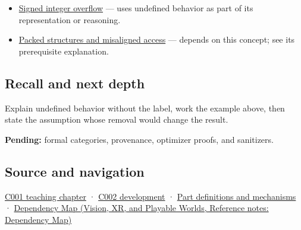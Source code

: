\hypertarget{appendix-f558f5b4d8f2-used-by}{}

\begin{itemize}
\item
  \hyperref[appendix-1a599c924a4e]{Signed integer overflow} --- uses undefined behavior as part of its representation or reasoning.
\item
  \hyperref[appendix-0682dbfc5f0e]{Packed structures and misaligned access} --- depends on this concept; see its prerequisite explanation.
\end{itemize}

\subsection{Recall and next depth}\label{appendix-f558f5b4d8f2-recall-and-next-depth}

\hypertarget{appendix-f558f5b4d8f2-recall-and-next-depth}{}

Explain undefined behavior without the label, work the example above, then state the assumption whose removal would change the result.

\textbf{Pending:} formal categories, provenance, optimizer proofs, and sanitizers.

\subsection{Source and navigation}\label{appendix-f558f5b4d8f2-source-and-navigation}

\hypertarget{appendix-f558f5b4d8f2-source-and-navigation}{}

\hyperref[01-foundations-i-ch001-from-a-signal-to-an-interpretation]{C001 teaching chapter} · \hyperref[01-foundations-i-ch001-arithmetic-becomes-a-policy]{C002 development} · \hyperref[appendix-fd090d982a15]{Part definitions and mechanisms} · \href{../07-Vision-XR-and-Playable-Worlds/main.pdf\#nameddest=appendix-4ad47bdd269a}{Dependency Map (Vision, XR, and Playable Worlds, Reference notes: Dependency Map)}
